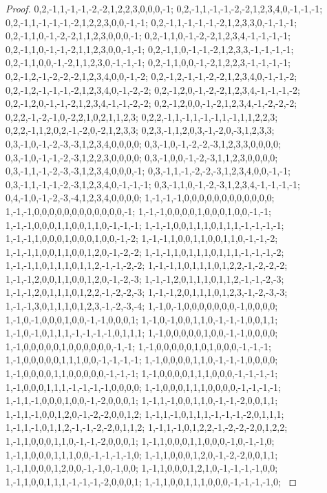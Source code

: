 \documentclass{article}
\begin{document}
\begin{proof}
{{0,2,-1,1,-1,-1,-2,-2,1,2,2,3,0,0,0,-1; 0,2,-1,1,-1,-1,-2,-2,1,2,3,4,0,-1,-1,-1; 0,2,-1,1,-1,-1,-1,-2,1,2,2,3,0,0,-1,-1; 0,2,-1,1,-1,-1,-1,-2,1,2,3,3,0,-1,-1,-1; 0,2,-1,1,0,-1,-2,-2,1,1,2,3,0,0,0,-1; 0,2,-1,1,0,-1,-2,-2,1,2,3,4,-1,-1,-1,-1; 0,2,-1,1,0,-1,-1,-2,1,1,2,3,0,0,-1,-1; 0,2,-1,1,0,-1,-1,-2,1,2,3,3,-1,-1,-1,-1; 0,2,-1,1,0,0,-1,-2,1,1,2,3,0,-1,-1,-1; 0,2,-1,1,0,0,-1,-2,1,2,2,3,-1,-1,-1,-1; 0,2,-1,2,-1,-2,-2,-2,1,2,3,4,0,0,-1,-2; 0,2,-1,2,-1,-1,-2,-2,1,2,3,4,0,-1,-1,-2;
0,2,-1,2,-1,-1,-1,-2,1,2,3,4,0,-1,-2,-2; 0,2,-1,2,0,-1,-2,-2,1,2,3,4,-1,-1,-1,-2; 0,2,-1,2,0,-1,-1,-2,1,2,3,4,-1,-1,-2,-2; 0,2,-1,2,0,0,-1,-2,1,2,3,4,-1,-2,-2,-2; 0,2,2,-1,-2,-1,0,-2,2,1,0,2,1,1,2,3; 0,2,2,-1,1,-1,1,-1,-1,1,-1,1,1,2,2,3; 0,2,2,-1,1,2,0,2,-1,-2,0,-2,1,2,3,3; 0,2,3,-1,1,2,0,3,-1,-2,0,-3,1,2,3,3; 0,3,-1,0,-1,-2,-3,-3,1,2,3,4,0,0,0,0; 0,3,-1,0,-1,-2,-2,-3,1,2,3,3,0,0,0,0; 0,3,-1,0,-1,-1,-2,-3,1,2,2,3,0,0,0,0; 0,3,-1,0,0,-1,-2,-3,1,1,2,3,0,0,0,0;
0,3,-1,1,-1,-2,-3,-3,1,2,3,4,0,0,0,-1; 0,3,-1,1,-1,-2,-2,-3,1,2,3,4,0,0,-1,-1; 0,3,-1,1,-1,-1,-2,-3,1,2,3,4,0,-1,-1,-1; 0,3,-1,1,0,-1,-2,-3,1,2,3,4,-1,-1,-1,-1; 0,4,-1,0,-1,-2,-3,-4,1,2,3,4,0,0,0,0; 1,-1,-1,-1,0,0,0,0,0,0,0,0,0,0,0,0; 1,-1,-1,0,0,0,0,0,0,0,0,0,0,0,0,-1; 1,-1,-1,0,0,0,0,1,0,0,0,1,0,0,-1,-1; 1,-1,-1,0,0,0,1,1,0,0,1,1,0,-1,-1,-1; 1,-1,-1,0,0,1,1,1,0,1,1,1,-1,-1,-1,-1; 1,-1,-1,1,0,0,0,1,0,0,0,1,0,0,-1,-2; 1,-1,-1,1,0,0,1,1,0,0,1,1,0,-1,-1,-2;
1,-1,-1,1,0,0,1,1,0,0,1,2,0,-1,-2,-2; 1,-1,-1,1,0,1,1,1,0,1,1,1,-1,-1,-1,-2; 1,-1,-1,1,0,1,1,1,0,1,1,2,-1,-1,-2,-2; 1,-1,-1,1,0,1,1,1,0,1,2,2,-1,-2,-2,-2; 1,-1,-1,2,0,0,1,1,0,0,1,2,0,-1,-2,-3; 1,-1,-1,2,0,1,1,1,0,1,1,2,-1,-1,-2,-3; 1,-1,-1,2,0,1,1,1,0,1,2,2,-1,-2,-2,-3; 1,-1,-1,2,0,1,1,1,0,1,2,3,-1,-2,-3,-3; 1,-1,-1,3,0,1,1,1,0,1,2,3,-1,-2,-3,-4; 1,-1,0,-1,0,0,0,0,0,0,0,-1,0,0,0,0; 1,-1,0,-1,0,0,0,1,0,0,-1,-1,0,0,0,1; 1,-1,0,-1,0,0,1,1,0,-1,-1,-1,0,0,1,1;
1,-1,0,-1,0,1,1,1,-1,-1,-1,-1,0,1,1,1; 1,-1,0,0,0,0,0,1,0,0,-1,-1,0,0,0,0; 1,-1,0,0,0,0,0,1,0,0,0,0,0,0,-1,-1; 1,-1,0,0,0,0,0,1,0,1,0,0,0,-1,-1,-1; 1,-1,0,0,0,0,0,1,1,1,0,0,-1,-1,-1,-1; 1,-1,0,0,0,0,1,1,0,-1,-1,-1,0,0,0,0; 1,-1,0,0,0,0,1,1,0,0,0,0,0,-1,-1,-1; 1,-1,0,0,0,0,1,1,1,0,0,0,-1,-1,-1,-1; 1,-1,0,0,0,1,1,1,-1,-1,-1,-1,0,0,0,0; 1,-1,0,0,0,1,1,1,0,0,0,0,-1,-1,-1,-1; 1,-1,1,-1,0,0,0,1,0,0,-1,-2,0,0,0,1; 1,-1,1,-1,0,0,1,1,0,-1,-1,-2,0,0,1,1;
1,-1,1,-1,0,0,1,2,0,-1,-2,-2,0,0,1,2; 1,-1,1,-1,0,1,1,1,-1,-1,-1,-2,0,1,1,1; 1,-1,1,-1,0,1,1,2,-1,-1,-2,-2,0,1,1,2; 1,-1,1,-1,0,1,2,2,-1,-2,-2,-2,0,1,2,2; 1,-1,1,0,0,0,1,1,0,-1,-1,-2,0,0,0,1; 1,-1,1,0,0,0,1,1,0,0,0,-1,0,-1,-1,0; 1,-1,1,0,0,0,1,1,1,0,0,-1,-1,-1,-1,0; 1,-1,1,0,0,0,1,2,0,-1,-2,-2,0,0,1,1; 1,-1,1,0,0,0,1,2,0,0,-1,-1,0,-1,0,0; 1,-1,1,0,0,0,1,2,1,0,-1,-1,-1,-1,0,0; 1,-1,1,0,0,1,1,1,-1,-1,-1,-2,0,0,0,1; 1,-1,1,0,0,1,1,1,0,0,0,-1,-1,-1,-1,0;
}}
\end{proof}
\end{document}
